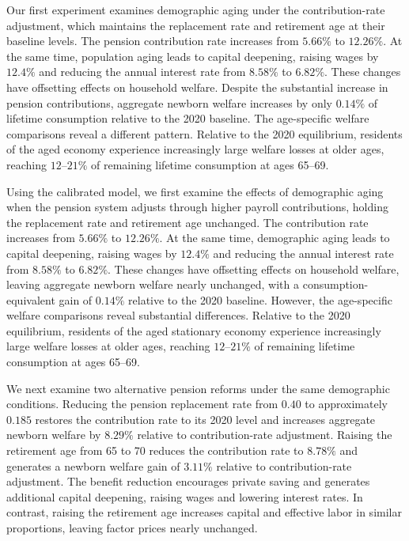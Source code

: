 \documentclass[12pt,a4paper]{article}
\begin{document}
Our first experiment examines demographic aging under the contribution-rate adjustment, which maintains the replacement rate and retirement age at their baseline levels. The pension contribution rate increases from $5.66\%$ to $12.26\%$. At the same time, population aging leads to capital deepening, raising wages by $12.4\%$ and reducing the annual interest rate from $8.58\%$ to $6.82\%$. These changes have offsetting effects on household welfare. Despite the substantial increase in pension contributions, aggregate newborn welfare increases by only $0.14\%$ of lifetime consumption relative to the 2020 baseline. The age-specific welfare comparisons reveal a different pattern. Relative to the 2020 equilibrium, residents of the aged economy experience increasingly large welfare losses at older ages, reaching $12$--$21\%$ of remaining lifetime consumption at ages 65--69.

Using the calibrated model, we first examine the effects of demographic aging when the pension system adjusts through higher payroll contributions, holding the replacement rate and retirement age unchanged. The contribution rate increases from $5.66\%$ to $12.26\%$. At the same time, demographic aging leads to capital deepening, raising wages by $12.4\%$ and reducing the annual interest rate from $8.58\%$ to $6.82\%$. These changes have offsetting effects on household welfare, leaving aggregate newborn welfare nearly unchanged, with a consumption-equivalent gain of $0.14\%$ relative to the 2020 baseline. However, the age-specific welfare comparisons reveal substantial differences. Relative to the 2020 equilibrium, residents of the aged stationary economy experience increasingly large welfare losses at older ages, reaching $12$--$21\%$ of remaining lifetime consumption at ages 65--69.

We next examine two alternative pension reforms under the same demographic conditions. Reducing the pension replacement rate from $0.40$ to approximately $0.185$ restores the contribution rate to its 2020 level and increases aggregate newborn welfare by $8.29\%$ relative to contribution-rate adjustment. Raising the retirement age from 65 to 70 reduces the contribution rate to $8.78\%$ and generates a newborn welfare gain of $3.11\%$ relative to contribution-rate adjustment. The benefit reduction encourages private saving and generates additional capital deepening, raising wages and lowering interest rates. In contrast, raising the retirement age increases capital and effective labor in similar proportions, leaving factor prices nearly unchanged.
\end{document}
